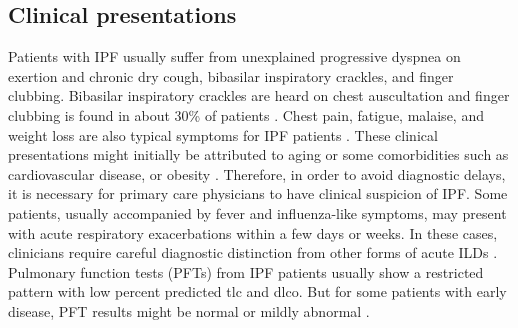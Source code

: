 \subsection{Clinical presentations}
Patients with IPF usually suffer from unexplained progressive dyspnea on exertion and chronic dry cough, bibasilar inspiratory crackles, and finger clubbing. Bibasilar inspiratory crackles are heard on chest auscultation and finger clubbing is found in about 30\% of patients \citep{raghu2011official,king2011idiopathic,richeldi2017idiopathic}. Chest pain, fatigue, malaise, and weight loss are also typical symptoms for IPF patients \citep{douglas2000idiopathic, king2001predicting}. These clinical presentations might initially be attributed to aging or some comorbidities such as cardiovascular disease, or obesity \citep{richeldi2017idiopathic}. Therefore, in order to avoid diagnostic delays, it is necessary for primary care physicians to have clinical suspicion of IPF. Some patients, usually accompanied by fever and influenza-like symptoms, may present with acute respiratory exacerbations within a few days or weeks. In these cases, clinicians require careful diagnostic distinction from other forms of acute ILDs \citep{richeldi2017idiopathic}. Pulmonary function tests (PFTs) from IPF patients usually show a restricted pattern with low percent predicted \gls{tlc} and \gls{dlco}. But for some patients with early disease, PFT results might be normal or mildly abnormal \citep{douglas2000idiopathic,raghu2006incidence}.

